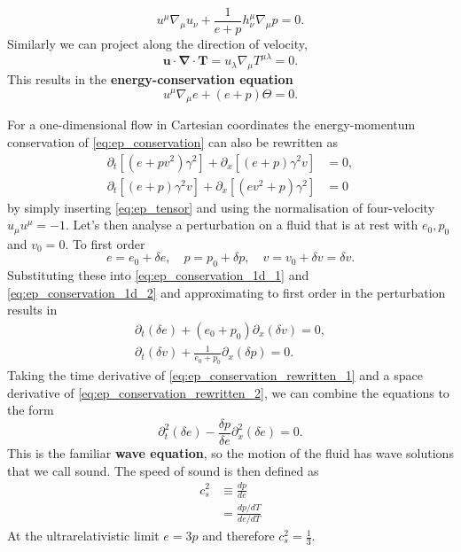 \cite[eq. 3.55]{rezzolla_relativistic_2013}
\begin{equation}
u^\mu \nabla_\mu u_\nu + \frac{1}{e+p} h^\mu_\nu \nabla_\mu p = 0.
\end{equation}
Similarly we can project along the direction of velocity,
\begin{equation}
\bm{u} \cdot \bm{\nabla} \cdot \bm{T} = u_\lambda \nabla_\mu T^{\mu\lambda} = 0.
\end{equation}
This results in the \textbf{energy-conservation equation}
\cite[eq. 3.57]{rezzolla_relativistic_2013}
\begin{equation}
u^\mu \nabla_\mu e + (e+p) \Theta = 0.
\end{equation}

For a one-dimensional flow in Cartesian coordinates the energy-momentum conservation of \eqref{eq:ep_conservation} can also be rewritten as
\begin{align}
\partial_t \left[ (e+pv^2) \gamma^2 \right] + \partial_x \left[ (e+p) \gamma^2 v \right] &= 0,
\label{eq:ep_conservation_1d_1} \\
\partial_t \left[ (e+p) \gamma^2 v \right] + \partial_x \left[ (ev^2 + p) \gamma^2 \right] &= 0
\label{eq:ep_conservation_1d_2}
\end{align}
by simply inserting \eqref{eq:ep_tensor} and using the normalisation of four-velocity $u_\mu u^\mu = -1$.
Let's then analyse a perturbation on a fluid that is at rest with $e_0, p_0$ and $v_0 = 0$.
To first order
\begin{equation}
e = e_0 + \delta e, \quad p=p_0 + \delta p, \quad v = v_0 + \delta v = \delta v.
\end{equation}
Substituting these into \eqref{eq:ep_conservation_1d_1} and \eqref{eq:ep_conservation_1d_2} and approximating to first order in the perturbation results in
\begin{align}
\partial_t (\delta e) + (e_0 + p_0) \partial_x (\delta v) = 0,
\label{eq:ep_conservation_rewritten_1} \\
\partial_t (\delta v) + \frac{1}{e_0 + p_0} \partial_x (\delta p) = 0.
\label{eq:ep_conservation_rewritten_2}
\end{align}
Taking the time derivative of \eqref{eq:ep_conservation_rewritten_1} and a space derivative of \eqref{eq:ep_conservation_rewritten_2}, we can combine the equations to the form
\begin{equation}
\partial_t^2 (\delta e) - \frac{\delta p}{\delta e} \partial_x^2(\delta e) = 0.
\end{equation}
This is the familiar \textbf{wave equation}, so the motion of the fluid has wave solutions that we call sound.
\cites[ch. 4.3]{rezzolla_relativistic_2013}[ch. 7.4]{lecture_notes}
The speed of sound is then defined as
\cites[eq. 2.168]{rezzolla_relativistic_2013}[eq. 13]{giese_2020}[eq. 3]{giese_2021}
\begin{align}
c_s^2
&\equiv \frac{dp}{de}
\label{eq:cs2_compact} \\
&= \frac{dp/dT}{de/dT}
\label{eq:cs2_explicit}
\end{align}
At the ultrarelativistic limit $e=3p$ and therefore $c_s^2=\frac{1}{3}$.

